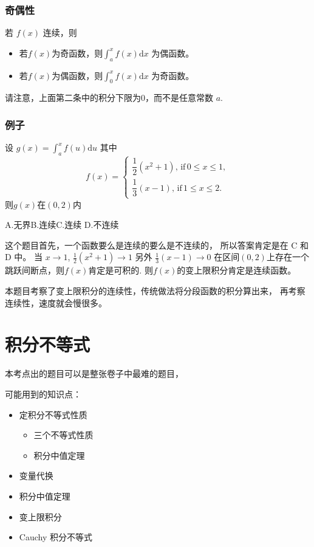 \subsubsection{奇偶性}

若 $f(x)$ 连续，则
\begin{itemize}
    \item 若$f(x)$为奇函数，则$\int_a^x f(x) \mathrm{d}x$ 为偶函数。
    \item 若$f(x)$为偶函数，则$\int_0^x f(x) \mathrm{d}x$ 为奇函数。
\end{itemize}
请注意，上面第二条中的积分下限为$0$，而不是任意常数 $a$.

\subsubsection{例子}

\begin{example}
    设 $g(x) = \int_a^x f(u) \mathrm{d} u$ 其中
    \[
        f(x) = \left\{
            \begin{array}{rl}
                \dfrac{1}{2} (x^2+1),\, \mbox{if}\, 0 \leq x \leq 1, \\[1em]
                \dfrac{1}{3} (x-1),  \, \mbox{if}\, 1 \leq x \leq 2.
            \end{array}
        \right.
    \]
    则$g(x)$在$(0, 2)$内

    A.无界\quad B.连续\quad C.连续 \quad D.不连续

    这个题目首先，一个函数要么是连续的要么是不连续的，
    所以答案肯定是在 C 和 D 中。
    当 $x \to 1$, $\frac{1}{2} (x^2 + 1) \to 1$ 
    另外 $\frac{1}{3} (x - 1) \to 0$
    在区间$(0,2)$上存在一个跳跃间断点，则$f(x)$肯定是可积的.
    则$f(x)$的变上限积分肯定是连续函数。

    本题目考察了变上限积分的连续性，传统做法将分段函数的积分算出来，
    再考察连续性，速度就会慢很多。
\end{example}


\section{积分不等式}

本考点出的题目可以是整张卷子中最难的题目，

可能用到的知识点：
\begin{itemize}
    \item 定积分不等式性质
        \begin{itemize}
            \item 三个不等式性质
            \item 积分中值定理
        \end{itemize}
    \item 变量代换
    \item 积分中值定理
    \item 变上限积分
    \item Cauchy 积分不等式
\end{itemize}

